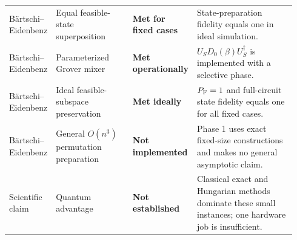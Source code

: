 \begin{landscape}
\begin{longtable}{p{0.14\linewidth}p{0.28\linewidth}p{0.14\linewidth}p{0.38\linewidth}}
Bärtschi--Eidenbenz & Equal feasible-state superposition & \cellcolor{AuditMet}\textbf{Met for fixed cases} & State-preparation fidelity equals one in ideal simulation.\\
Bärtschi--Eidenbenz & Parameterized Grover mixer & \cellcolor{AuditMet}\textbf{Met operationally} & $U_SD_0(\beta)U_S^\dagger$ is implemented with a selective phase.\\
Bärtschi--Eidenbenz & Ideal feasible-subspace preservation & \cellcolor{AuditMet}\textbf{Met ideally} & $P_{\mathrm{F}}=1$ and full-circuit state fidelity equals one for all fixed cases.\\
Bärtschi--Eidenbenz & General $O(n^3)$ permutation preparation & \cellcolor{AuditNo}\textbf{Not implemented} & Phase 1 uses exact fixed-size constructions and makes no general asymptotic claim.\\
Scientific claim & Quantum advantage & \cellcolor{AuditNo}\textbf{Not established} & Classical exact and Hungarian methods dominate these small instances; one hardware job is insufficient.\\
\bottomrule
\end{longtable}
\end{landscape}
